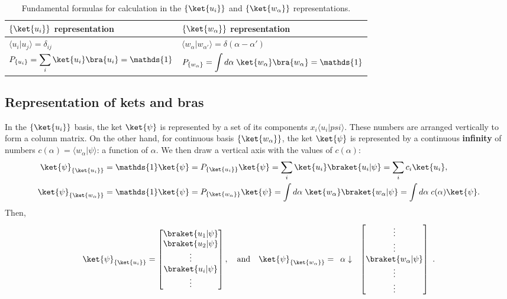 \begin{table}[h!]
    \centering
    \caption{Fundamental formulas for calculation in the $\{\ket{u_i}\}$ and $\{\ket{w_\alpha}\}$ representations.}
    \renewcommand{\arraystretch}{1.5}
    \begin{tabular}{l|l}
        $\{\ket{u_i}\}$ representation&$\{\ket{w_\alpha}\}$ representation\\
        \hline
        $\langle u_i|u_j\rangle=\delta_{ij}$&$\langle w_\alpha|w_{\alpha'}\rangle=\delta(\alpha-\alpha')$\\
        $P_{\{u_i\}}=\displaystyle\sum_i\ket{u_i}\bra{u_i}=\mathds{1}$&$P_{\{w_\alpha\}}=\displaystyle\int d\alpha\;\ket{w_\alpha}\bra{w_\alpha}=\mathds{1}$
    \end{tabular}
\end{table}
\subsection{Representation of kets and bras}
In the $\{\ket{u_i}\}$ basis, the ket $\ket{\psi}$ is represented by a set of its components $x_i\langle u_i|psi\rangle$. These numbers are 
arranged vertically to form a column matrix. On the other hand, for continuous basis $\{\ket{w_\alpha}\}$, the ket $\ket{\psi}$ is represented by a continuous 
\textbf{infinity} of numbers $c(\alpha)=\langle w_\alpha|\psi\rangle$: a function of $\alpha$. We then draw a vertical axis with the values of $c(\alpha)$:
\begin{align*}
    \ket{\psi}_{\{\ket{u_i}\}}&=\mathds{1}\ket{\psi}=P_{\{\ket{u_i}\}}\ket{\psi}=\sum_i\ket{u_i}\braket{u_i|\psi}=\sum_ic_i\ket{u_i},\\
    \ket{\psi}_{\{\ket{w_\alpha}\}}&=\mathds{1}\ket{\psi}=P_{\{\ket{w_\alpha}\}}\ket{\psi}=\int d\alpha\;\ket{w_\alpha}\braket{w_\alpha|\psi}=\int d\alpha\;c(\alpha)\ket{\psi}.
\end{align*}
Then,
\begin{align}
    \ket{\psi}_{\{\ket{u_i}\}}=\begin{bmatrix}
        \braket{u_1|\psi}\\
        \braket{u_2|\psi}\\
        \vdots\\
        \braket{u_i|\psi}\\\vdots
    \end{bmatrix},\quad\text{and}\quad 
    \ket{\psi}_{\{\ket{w_\alpha}\}}=
    \begin{array}{ll}
    \alpha\downarrow&\begin{bmatrix}
        \vdots\\\vdots\\\braket{w_\alpha|\psi}\\\vdots\\\vdots
    \end{bmatrix}
    \end{array}.
\end{align}


